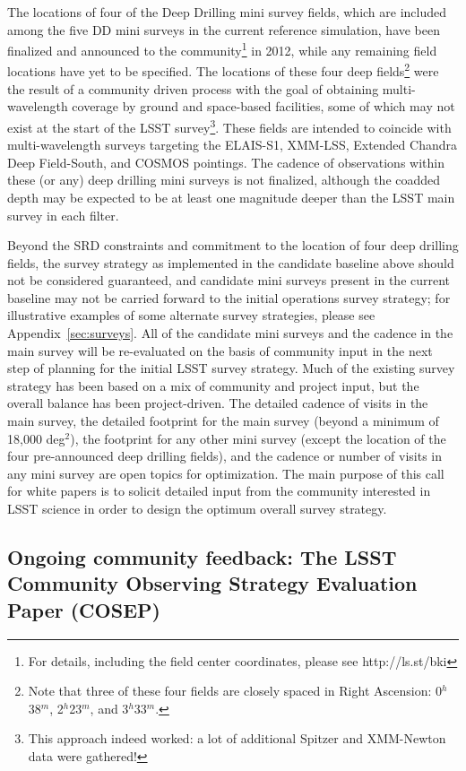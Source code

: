 \documentclass[DM,toc,usenatbib]{lsstdoc}
\begin{document}
The locations of four of the Deep Drilling mini survey fields, which are included among the five DD mini surveys in the current reference simulation, 
have been finalized and announced to the community\footnote{For details, including the field center coordinates, 
please see http://ls.st/bki} in 2012, while any remaining field locations 
have yet to be specified. The locations of these four deep fields\footnote{Note that three of these four fields are
closely spaced in Right Ascension: 0$^h$38$^m$, 2$^h$23$^m$, and 3$^h$33$^m$.} were 
the result of a community driven process 
with the goal of obtaining multi-wavelength coverage by ground and space-based facilities,  some of which may 
not exist at the start of the LSST survey\footnote{This approach indeed worked: a lot of additional Spitzer and XMM-Newton 
data were gathered!}.
These fields are intended to coincide with multi-wavelength surveys targeting the ELAIS-S1, XMM-LSS, Extended Chandra Deep Field-South, 
and COSMOS pointings. The cadence of observations within these (or any) deep drilling mini surveys is not finalized, although the coadded
depth may be expected to be at least one magnitude deeper than the LSST main survey in each filter.

Beyond the SRD constraints and commitment to the location of four deep drilling fields, the survey strategy as implemented in the candidate baseline 
above should not be considered guaranteed, and candidate mini surveys present in the current baseline may not be carried forward to
the initial operations survey strategy; for illustrative examples of some alternate survey strategies, please see Appendix~\ref{sec:surveys}.
All of the candidate mini surveys and the cadence in the main survey will be re-evaluated on the basis of community input in the next 
step of planning for the initial LSST survey strategy. Much of the existing survey strategy 
has been based on a mix of community and project input, but the overall balance has been project-driven. 
The detailed cadence of visits in the main survey, the detailed footprint for the main survey (beyond a minimum of 18,000 deg$^2$), 
the footprint for any other mini survey (except the location of the four pre-announced 
deep drilling fields), and the cadence or number of visits in any mini survey are open topics for optimization. 
The main purpose of this call for white papers is to solicit detailed input from the community interested in 
LSST science in order to design the optimum overall survey strategy. 


\subsection{Ongoing community feedback: The LSST Community Observing Strategy Evaluation Paper (COSEP)}
\end{document}
